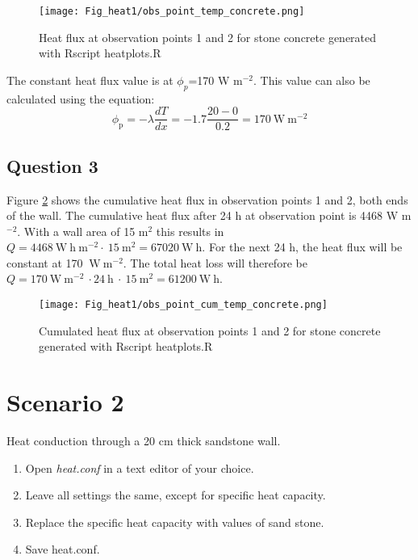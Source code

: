 \begin{figure}[!h]
\centering
\texttt{[image: Fig\_heat1/obs\_point\_temp\_concrete.png]}
\caption{\label{plot2} Heat flux at observation points 1 and 2 for stone concrete generated with Rscript heatplots.R}
\end{figure}

The constant heat flux value is at $\phi_{p}$=170 W m$^{-2}$. This value can also be calculated using the equation:
\begin{equation*}
\phi_{\mathrm{p}}=-\lambda\frac{dT}{dx}= -1.7 \frac{20-0}{0.2}= 170 \mathrm{~W~m^{-2}}
\end{equation*}

\newpage
\subsection*{Question 3}

Figure \ref{plot3} shows the cumulative heat flux in observation points 1 and 2, both ends of the wall. The cumulative heat flux after 24 h at observation point is 4468 W m$^{-2}$. With a wall area of 15 m$^2$ this results in $Q = 4468~\mathrm{W~h~m^{-2}}\cdot~15~\mathrm{m^{2}}= 67020 ~\mathrm{W~h}$. 
For the next 24 h, the heat flux will be constant at 170 $\mathrm{~W~m^{-2}}$. The total heat loss will therefore be $Q=170 \mathrm{~W~m^{-2}}~\cdot 24~\mathrm{h}~\cdot~15~\mathrm{m^{2}}=61200 \mathrm{~W~h}$.

\begin{figure}[!h]
\centering
\texttt{[image: Fig\_heat1/obs\_point\_cum\_temp\_concrete.png]}
\caption{\label{plot3} Cumulated heat flux at observation points 1 and 2 for stone concrete generated with Rscript heatplots.R}
\end{figure}

\newpage

\section*{Scenario 2}
Heat conduction through a 20 cm thick sandstone wall. 

\begin{enumerate}
\item Open \emph{heat.conf} in a text editor of your choice. 
\item Leave all settings the same, except for specific heat capacity. 
\item Replace the specific heat capacity with values of sand stone.
\item Save heat.conf.
\end{enumerate}


